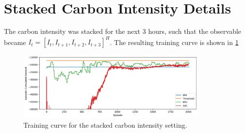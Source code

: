 \section{Stacked Carbon Intensity Details} \label{sec:stacked_carbon_intensity_details}
The carbon intensity was stacked for the next 3 hours, such that the observable became $I_t = [I_t, I_{t+1}, I_{t+2}, I_{t+3}]^H$. The resulting training curve is shown in \cref{fig:training_curve_stacked}

\begin{figure}[H]
    \centering
    \includegraphics[width=0.85\textwidth]{figures/training_curve_stacked.png}
    \caption{Training curve for the stacked carbon intensity setting.}
    \label{fig:training_curve_stacked}
\end{figure}

